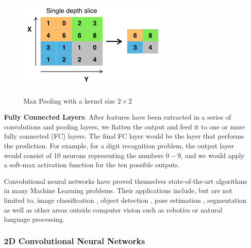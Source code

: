 \documentclass[extern,palatino]{cgMA}
\begin{document}
\begin{figure}[h]
\center
\includegraphics[height={150pt}, width={220pt}]{images/max_pooling.png}
\caption{Max Pooling with a kernel size $2 \times 2$ \cite{georgiou2020survey}}
\label{max_pooling}
\end{figure}

\bigskip
\noindent\textbf{Fully Connected Layers}: After features have been extracted in a series of convolutions and pooling layers, we flatten the output and feed it to one or more fully connected (FC) layers. The final FC layer would be the layer that performs the prediction. For example, for a digit recognition problem, the output layer would consist of 10 neurons representing the numbers $0-9$, and we would apply a soft-max activation function \cite{nwankpa2018activation} for the ten possible outputs.

\bigskip
\noindent Convolutional neural networks have proved themselves state-of-the-art algorithms in many Machine Learning problems. Their applications include, but are not limited to, image classification \cite{he2016deep}, object detection \cite{redmon2018yolov3}, pose estimation \cite{toshev2014deeppose}, segmentation \cite{cao2019gcnet} as well as other areas outside computer vision such as robotics or natural language processing.

\subsubsection{2D Convolutional Neural Networks}
\label{2d_convolutional_neural_networks_background}
\end{document}
